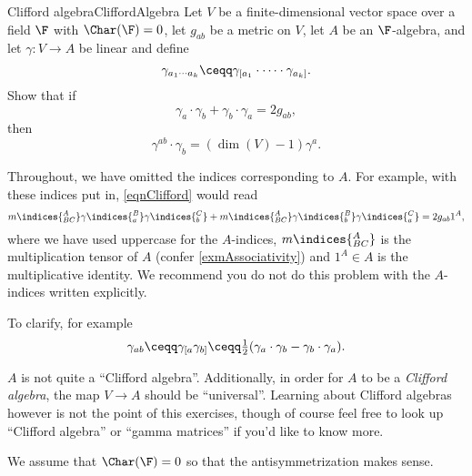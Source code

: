 \begin{exr}{Clifford algebra}{CliffordAlgebra}
	Let $V$ be a finite-dimensional vector space over a field $\F$ with $\Char (\F )=0$, let $g_{ab}$ be a metric on $V$, let $A$ be an $\F$-algebra, and let $\gamma \colon V\rightarrow A$ be linear and define
	\begin{equation}
		\gamma _{a_1\cdots a_k}\ceqq \gamma _{[a_1}\cdot \cdots \cdot \gamma _{a_k]}.
	\end{equation}
	Show that if
	\begin{equation}\label{eqnClifford}
		\gamma _a\cdot \gamma _b+\gamma _b\cdot \gamma _a=2g_{ab},
	\end{equation}
	then
	\begin{equation}
	\gamma ^{ab}\cdot \gamma _b=(\dim (V)-1)\gamma ^a.
	\end{equation}
	\begin{rmk}
		Throughout, we have omitted the indices corresponding to $A$.  For example, with these indices put in, \eqref{eqnClifford} would read
		\begin{equation*}
			m\indices{^A_{BC}}\gamma \indices{^B_a}\gamma \indices{^C_b}+m\indices{^A_{BC}}\gamma \indices{^B_b}\gamma \indices{^C_a}=2g_{ab}1^A,
		\end{equation*}
		where we have used uppercase for the $A$-indices, $m\indices{^A_{BC}}$ is the multiplication tensor of $A$ (confer \cref{exmAssociativity}) and $1^A\in A$ is the multiplicative identity.  We recommend you do not do this problem with the $A$-indices written explicitly.
	\end{rmk}
	\begin{rmk}
		To clarify, for example
		\begin{equation}
			\gamma _{ab}\ceqq \gamma _{[a}\gamma _{b]}\ceqq \tfrac{1}{2}(\gamma _a\cdot \gamma _b-\gamma _b\cdot \gamma _a).
		\end{equation}
	\end{rmk}
	\begin{rmk}
		$A$ is not quite a ``Clifford algebra''.  Additionally, in order for $A$ to be a \emph{Clifford algebra}, the map $V\rightarrow A$ should be ``universal''.  Learning about Clifford algebras however is not the point of this exercises, though of course feel free to look up ``Clifford algebra'' or ``gamma matrices'' if you'd like to know more.
	\end{rmk}
	\begin{rmk}
		We assume that $\Char (\F )=0$ so that the antisymmetrization makes sense.
	\end{rmk}

\end{exr}
